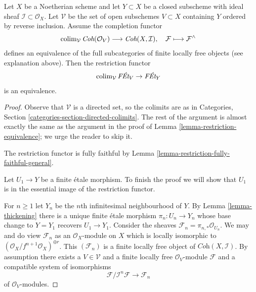 \begin{lemma}
\label{lemma-restriction-equivalence-general}
Let $X$ be a Noetherian scheme and let $Y \subset X$ be a closed subscheme
with ideal sheaf $\mathcal{I} \subset \mathcal{O}_X$.
Let $\mathcal{V}$ be the set of open subschemes $V \subset X$ containing $Y$
ordered by reverse inclusion. Assume the completion functor
$$
\mathop{\mathrm{colim}}\nolimits_\mathcal{V} \textit{Coh}(\mathcal{O}_V)
\longrightarrow
\textit{Coh}(X, \mathcal{I}),
\quad
\mathcal{F} \longmapsto \mathcal{F}^\wedge
$$
defines an equivalence of the full subcategories of
finite locally free objects (see explanation above).
Then the restriction functor
$$
\mathop{\mathrm{colim}}\nolimits_\mathcal{V} \textit{F\'Et}_V \to \textit{F\'Et}_Y
$$
is an equivalence.
\end{lemma}

\begin{proof}
Observe that $\mathcal{V}$ is a directed set, so the colimits are
as in Categories, Section \ref{categories-section-directed-colimits}.
The rest of the argument is almost exactly the same as the argument
in the proof of Lemma \ref{lemma-restriction-equivalence}; we urge
the reader to skip it.

\medskip\noindent
The restriction functor is fully faithful by
Lemma \ref{lemma-restriction-fully-faithful-general}.

\medskip\noindent
Let $U_1 \to Y$ be a finite \'etale morphism. To finish the proof
we will show that $U_1$ is in the essential image of the
restriction functor.

\medskip\noindent
For $n \geq 1$ let $Y_n$ be the $n$th infinitesimal neighbourhood of $Y$.
By Lemma \ref{lemma-thickening}
there is a unique finite \'etale morphism
$\pi_n : U_n \to Y_n$ whose base change to $Y = Y_1$
recovers $U_1 \to Y_1$.
Consider the sheaves $\mathcal{F}_n = \pi_{n, *}\mathcal{O}_{U_n}$.
We may and do view $\mathcal{F}_n$ as an $\mathcal{O}_X$-module on $X$
which is locally isomorphic to
$(\mathcal{O}_X/f^{n + 1}\mathcal{O}_X)^{\oplus r}$.
This $(\mathcal{F}_n)$ is a finite locally free object of
$\textit{Coh}(X, \mathcal{I})$.
By assumption there exists a $V \in \mathcal{V}$
and a finite locally free $\mathcal{O}_V$-module $\mathcal{F}$
and a compatible system of isomorphisms
$$
\mathcal{F}/\mathcal{I}^n\mathcal{F} \to \mathcal{F}_n
$$
of $\mathcal{O}_V$-modules.


\end{proof}
